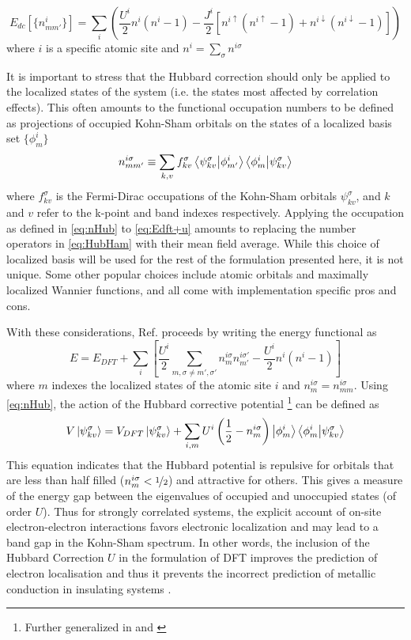 \documentclass[12pt]{article}
\newcommand{\lrp}[1]{\left( #1 \right)}
\newcommand{\lrb}[1]{\left[ #1 \right]}
\begin{document}
\begin{equation*}
    E_{dc}[\{n^i_{mm'}\}] = 
    \sum_i\lrp{\frac{U^i}{2}n^i\lrp{n^i-1}-\frac{J^i}{2}\lrb{n^{i\uparrow}\lrp{n^{i\uparrow}-1}+n^{i\downarrow}\lrp{n^{i\downarrow}-1}}}
\end{equation*}
where  $i$ is a specific atomic site and $n^i = \sum_{\sigma}n^{i\sigma}$

It is important to stress that the Hubbard correction should only be applied to the localized states of the system (i.e. the states most affected by correlation effects). This often amounts to the functional occupation numbers to be defined as projections of occupied Kohn-Sham orbitals on the states of a localized basis set $\{\phi^i_{m}\}$
\begin{equation}\label{eq:nHub}
    n^{i\sigma}_{mm'} \equiv \sum_{k,v}f^\sigma_{kv}\bra{\psi^\sigma_{kv}}\ket{\phi^i_{m'}}\bra{\phi^i_{m}}\ket{\psi^\sigma_{kv}}
\end{equation}
where $f^\sigma_{kv}$ is the Fermi-Dirac occupations of the Kohn-Sham orbitals $\psi^\sigma_{kv}$, and $k$ and $v$ refer to the k-point and band indexes respectively. Applying the occupation as defined in \eqref{eq:nHub} to \eqref{eq:Edft+u} amounts to replacing the number operators in \eqref{eq:HubHam} with their mean field average. While this choice of localized basis will be used for the rest of the formulation presented here, it is not unique. Some other popular choices include atomic orbitals and maximally localized Wannier functions, and all come with implementation specific pros and cons. 

With these considerations, Ref. \cite{OGDFT+U} proceeds by writing the energy functional as 
\begin{equation}
    E = E_{DFT} + \sum_i \lrb{\frac{U^i}{2}\sum_{m,\sigma\neq m',\sigma'}n_{m}^{i\sigma}n^{i\sigma'}_{m'}-\frac{U^i}{2}n^i(n^i-1)}
\end{equation}
where $m$ indexes the localized states of the atomic site $i$ and $n_{m}^{i\sigma} = n_{mm}^{i\sigma}$. Using \eqref{eq:nHub}, the action of the Hubbard corrective potential \footnote{Further generalized in \cite{DFT+Uformulation} and \cite{Duradev}} can be defined as 
\begin{equation}
    V\ket{\psi^\sigma_{kv}} = V_{DFT}\ket{\psi^\sigma_{kv}} + \sum_{i,m}U^i\lrp{\frac{1}{2}-n^{i\sigma}_m}\ket{\phi^i_{m}}\bra{\phi^i_{m}}\ket{\psi^\sigma_{kv}}
\end{equation}
This equation indicates that the Hubbard potential is repulsive for orbitals that are less than half filled ($n_m^{i\sigma}<\nicefrac{1}{2}$) and attractive for others. This gives a measure of the energy gap between the eigenvalues of occupied and unoccupied states (of order $U$). Thus for strongly correlated systems, the explicit account of on-site electron-electron interactions favors electronic localization and may lead to a band gap in the Kohn-Sham spectrum.
In other words, the inclusion of the Hubbard Correction $U$ in the formulation of DFT improves the prediction of electron localisation and thus it prevents the incorrect prediction of metallic conduction in insulating systems \cite{HUBgood}.

\newpage
\printbibliography[keyword={Print Reference},title={Bibliography}]
\printbibliography[keyword={Figure},title={Figures}]
\end{document}
